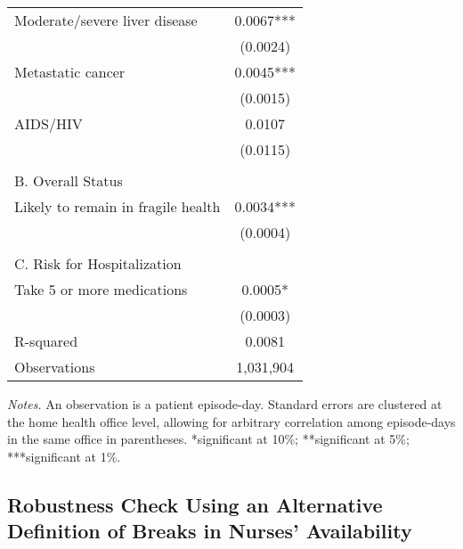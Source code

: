 \documentclass[final,12pt, notitlepage]{article}
\begin{document}
\begin{singlespace}
\begin{table}[H]
\begin{threeparttable}
{\begin{tabular}{lc}
Moderate/severe liver disease & 0.0067*** \\
 & (0.0024) \\
Metastatic cancer & 0.0045*** \\
 & (0.0015) \\
AIDS/HIV & 0.0107 \\
 & (0.0115) \\
\\
\multicolumn{2}{l}{B. Overall Status}\\
Likely to remain in fragile health & 0.0034*** \\
 & (0.0004) \\
\\
\multicolumn{2}{l}{C. Risk for Hospitalization}\\
Take 5 or more medications & 0.0005* \\
 & (0.0003) \\
R-squared & 0.0081 \\
Observations & 1,031,904 \\
\bottomrule
\end{tabular}
}
	\begin{tablenotes}
	\scriptsize
	\item \emph{Notes.} %
	An observation is a patient episode-day. Standard errors are clustered at the home health office level, allowing for arbitrary correlation among episode-days in the same office in parentheses.
	*significant at 10\%; **significant at 5\%; ***significant at 1\%.
	\end{tablenotes}
\end{threeparttable}
\end{table}


\clearpage
\subsection{Robustness Check Using an Alternative Definition of Breaks in Nurses' Availability} \label{appendix:lws_dist_alt}


\end{singlespace}
\end{document}
